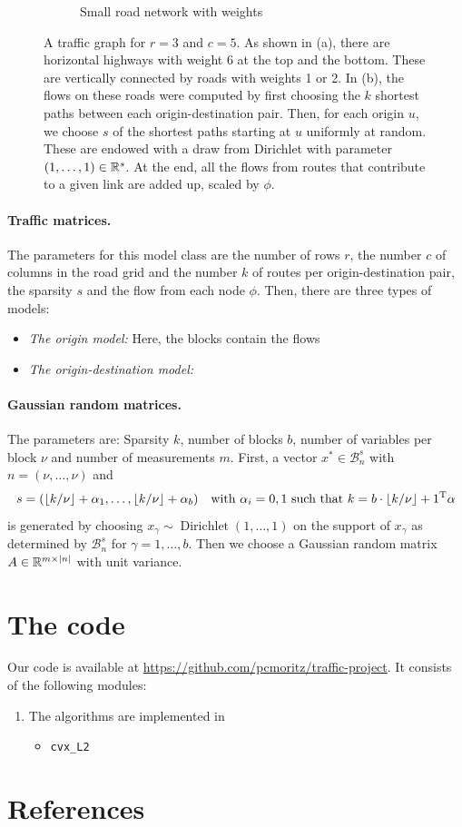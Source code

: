 \documentclass{article} %
\begin{document}
\begin{figure}
\begin{subfigure}[h]{0.4\textwidth}
    \caption{Small road network with weights}
  \end{subfigure}
  \caption{A traffic graph for $r=3$ and $c=5$. As shown in (a), there are horizontal highways with weight $6$ at the top and the bottom. These are vertically connected by roads with weights 1 or 2. In (b), the flows on these roads were computed by first choosing the $k$ shortest paths between each origin-destination pair. Then, for each origin $u$, we choose $s$ of the shortest paths starting at $u$ uniformly at random. These are endowed with a draw from Dirichlet with parameter $(1, \dots, 1)\in \mathbb{R}^s$. At the end, all the flows from routes that contribute to a given link are added up, scaled by $\phi$.}
\end{figure}
\paragraph{Traffic matrices.} The parameters for this model class are the number of rows $r$, the number $c$ of columns in the road grid and the number $k$ of routes per origin-destination pair, the sparsity $s$ and the flow from each node $\phi$. Then, there are three types of models:
\begin{itemize}
  \item \emph{The origin model:} Here, the blocks contain the flows
  \item \emph{The origin-destination model:}
\end{itemize}

\paragraph{Gaussian random matrices.} The parameters are: Sparsity $k$, number of blocks $b$, number of variables per block $\nu$ and number of measurements $m$.
First, a vector $x^*\in \mathcal B_n^s$ with $n = (\nu, \dots, \nu)$ and
\begin{equation*}
s = (\lfloor k/\nu\rfloor + \alpha_1, \dots, \lfloor k/\nu\rfloor + \alpha_b)\quad\text{with $\alpha_i = 0, 1$ such that $k = b\cdot \lfloor k/\nu\rfloor + 1^{\rm T} \alpha$}
\end{equation*}
is generated by choosing $x_\gamma \sim \operatorname{Dirichlet}(1,
\dots, 1)$ on the support of $x_\gamma$ as determined by $\mathcal
B_n^s$ for $\gamma = 1, \dots, b$. Then we choose a Gaussian random matrix $A\in \mathbb{R}^{m\times |n|}$ with unit variance.

\section{The code}
Our code is available at \url{https://github.com/pcmoritz/traffic-project}. It consists of the following modules:
\begin{enumerate}
  \item The algorithms are implemented in
    \begin{itemize}
      \item \texttt{cvx\_L2}
      \end{itemize}
\end{enumerate}

\section{References}

\FloatBarrier
\vskip 0.2in
\nocite{*}


\end{document}
